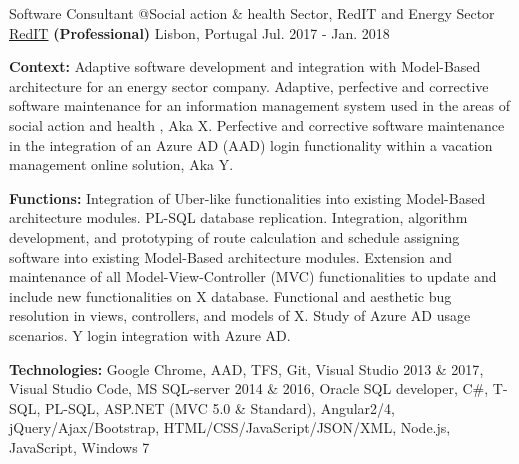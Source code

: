 \begin{cventries}
  \cventry
    {Software Consultant @Social action \& health Sector, %
    RedIT and 
    Energy Sector %
    } %
    {\href{https://www.reditpro.com/}{RedIT} \textbf{(Professional)}} %
    {Lisbon, Portugal} %
    {Jul. 2017 - Jan. 2018} 
    {
      \begin{cvitems} %
		\item[] {\textbf{Context:} 
Adaptive software development and integration with Model-Based architecture for an energy sector company. %
Adaptive, perfective and corrective software maintenance for an information management system used in the areas of social action and health%
, Aka X.
Perfective and corrective software maintenance in the integration of an Azure AD (AAD) login functionality within a vacation management online solution, Aka Y.}
		\item[] {\textbf{Functions:} Integration of Uber-like functionalities into existing Model-Based architecture modules. PL-SQL database replication. Integration, algorithm development, and prototyping of route calculation and schedule assigning software into existing Model-Based architecture modules.
		Extension and maintenance of all Model-View-Controller (MVC) functionalities to update and include new functionalities on X database. Functional and aesthetic bug resolution in views, controllers, and models of X.
		Study of Azure AD usage scenarios. Y login integration with Azure AD.}		
		\item[] {\textbf{Technologies:} 
		\textcolor{rainbowcolor-olive}{Google Chrome}, 
		\textcolor{rainbowcolor-olive}{AAD}, 
		\textcolor{rainbowcolor-olive}{TFS}, 
		\textcolor{rainbowcolor-olive}{Git}, 
		\textcolor{rainbowcolor-olive}{Visual Studio 2013 \& 2017},
		\textcolor{rainbowcolor-olive}{Visual Studio Code}, 
		\textcolor{rainbowcolor-olive}{MS SQL-server 2014 \& 2016},
		\textcolor{rainbowcolor-olive}{Oracle SQL developer},
		\textcolor{rainbowcolor-indigo}{C\#}, 
		\textcolor{rainbowcolor-indigo}{T-SQL},
		\textcolor{rainbowcolor-indigo}{PL-SQL}, 
		\textcolor{rainbowcolor-indigo}{ASP.NET (MVC 5.0 \& Standard)}, 
		\textcolor{rainbowcolor-indigo}{Angular2/4}, 
		\textcolor{rainbowcolor-indigo}{jQuery/Ajax/Bootstrap},		
		\textcolor{rainbowcolor-indigo}{HTML/CSS/JavaScript/JSON/XML}, 
		\textcolor{rainbowcolor-indigo}{Node.js}, 
		\textcolor{rainbowcolor-indigo}{JavaScript}, 
		\textcolor{rainbowcolor-orange}{Windows 7}}	
      \end{cvitems}
    } 
    

\end{cventries}
